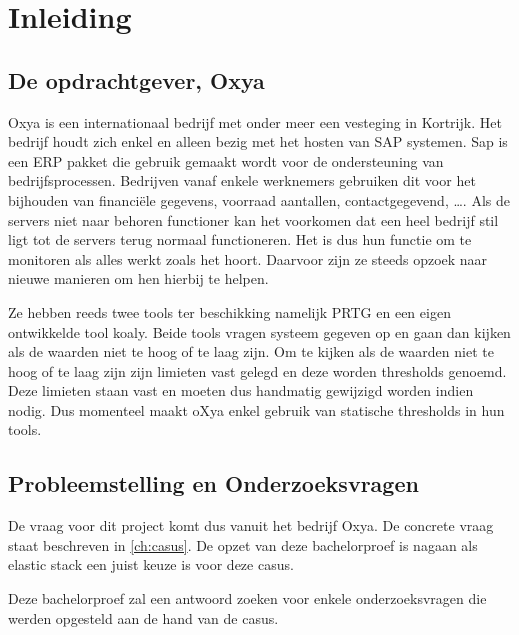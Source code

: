 
\chapter{Inleiding}
\label{ch:inleiding}

\section{De opdrachtgever, Oxya}
\label{sec:de-opdrachtgever}

Oxya is een internationaal bedrijf met onder meer een vesteging in Kortrijk. Het bedrijf houdt zich enkel en alleen bezig met het hosten van SAP systemen. Sap is een ERP pakket die gebruik gemaakt wordt voor de ondersteuning van bedrijfsprocessen. Bedrijven vanaf enkele werknemers gebruiken dit voor het bijhouden van financiële gegevens, voorraad aantallen, contactgegevend, \dots. Als de servers niet naar behoren functioner kan het voorkomen dat een heel bedrijf stil ligt tot de servers terug normaal functioneren. Het is dus hun functie om te monitoren als alles werkt zoals het hoort. Daarvoor zijn ze steeds opzoek naar nieuwe manieren om hen hierbij te helpen.

Ze hebben reeds twee tools ter beschikking namelijk PRTG en een eigen ontwikkelde tool koaly. Beide tools vragen systeem gegeven op en gaan dan kijken als de waarden niet te hoog of te laag zijn. Om te kijken als de waarden niet te hoog of te laag zijn zijn limieten vast gelegd en deze worden thresholds genoemd. Deze limieten staan vast en moeten dus handmatig gewijzigd worden indien nodig. Dus momenteel maakt oXya enkel gebruik van statische thresholds in hun tools.

\section{Probleemstelling en Onderzoeksvragen}
\label{sec:onderzoeksvragen}

De vraag voor dit project komt dus vanuit het bedrijf Oxya. De concrete vraag staat beschreven in \ref{ch:casus}. De opzet van deze bachelorproef is nagaan als elastic stack een juist keuze is voor deze casus.  

Deze bachelorproef zal een antwoord zoeken voor enkele onderzoeksvragen die werden opgesteld aan de hand van de casus.

